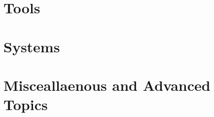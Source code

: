 \documentclass[12pt,a4paper]{book}
\begin{document}

\part{Tools}







\part{Systems}





\part{Misceallaenous and Advanced Topics}
\label{part:adv_topics}












\end{document}
